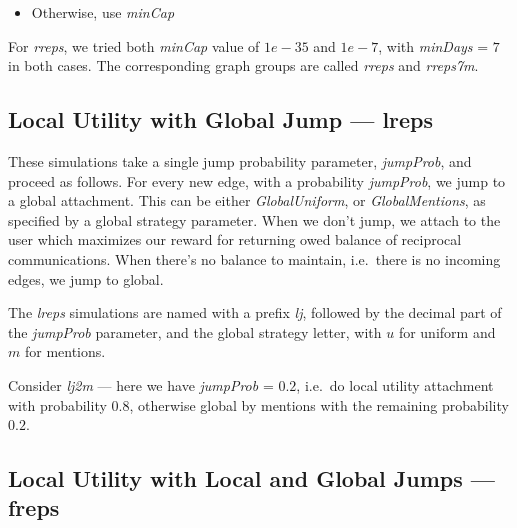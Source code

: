 \documentclass[10pt,oneside]{memoir}
\begin{document}
\begin{Spacing}{2}
\begin{itemize}
\item Otherwise, use {\itshape minCap}
\end{itemize}

For {\itshape rreps}, we tried both {\itshape minCap} value of $1e-35$ and $1e-7$, with {\itshape minDays} = $7$ in both cases.  The corresponding graph groups are called {\itshape rreps} and {\itshape rreps7m}.


\subsection{Local Utility with Global Jump --- lreps}
\label{localutilitywithglobaljumplreps}

These simulations take a single jump probability parameter, {\itshape jumpProb}, and proceed as follows.  For every new edge, with a probability {\itshape jumpProb}, we jump to a global attachment.  This can be either {\itshape GlobalUniform}, or {\itshape GlobalMentions}, as specified by a global strategy parameter.  When we don't jump, we attach to the user which maximizes our reward for returning owed balance of reciprocal communications.  When there's no balance to maintain, i.e.\ there is no incoming edges, we jump to global.


The {\itshape lreps} simulations are named with a prefix {\itshape lj}, followed by the decimal part of the {\itshape jumpProb} parameter, and the global strategy letter, with $u$ for uniform and $m$ for mentions.


Consider {\itshape lj2m} --- here we have {\itshape jumpProb} = $0.2$, i.e.\ do local utility attachment with probability $0.8$, otherwise global by mentions with the remaining probability $0.2$.


\subsection{Local Utility with Local and Global Jumps --- freps}
\label{localutilitywithlocalandglobaljumpsfreps}


\end{Spacing}
\end{document}
